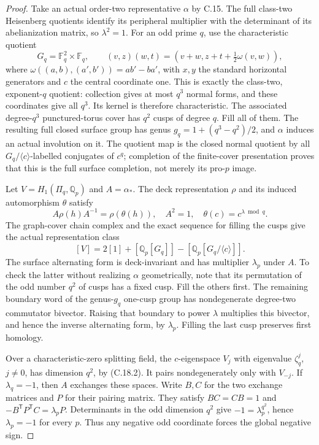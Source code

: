 \begin{proof}
Take an actual order-two representative $\alpha$ by C.15.
The full class-two Heisenberg quotients identify its
peripheral multiplier with the determinant of its
abelianization matrix, so $\lambda^2=1$.
For an odd prime $q$, use the characteristic quotient
\[
 G_q=\mathbb F_q^2\times\mathbb F_q,\qquad
 (v,z)(w,t)=(v+w,z+t+\tfrac12\omega(v,w)),
\]
where $\omega((a,b),(a',b'))=ab'-ba'$, with $x,y$
the standard horizontal generators and $c$ the central
coordinate one.  This is exactly the class-two,
exponent-$q$ quotient: collection gives at most $q^3$
normal forms, and these coordinates give all $q^3$.
Its kernel is therefore characteristic.
The associated degree-$q^3$ punctured-torus cover has
$q^2$ cusps of degree $q$.  Fill all of them.  The
resulting full closed surface group has genus
$g_q=1+(q^3-q^2)/2$, and $\alpha$ induces an actual
involution on it.  The quotient map is the closed
normal quotient by all $G_q/\langle c\rangle$-labelled
conjugates of $c^q$; completion of the finite-cover
presentation proves that this is the full surface
completion, not merely its pro-$p$ image.

Let $V=H_1(\Pi_q,\mathbb Q_p)$ and $A=\alpha_*$.  The
deck representation $\rho$ and its induced automorphism
$\theta$ satisfy
\[
 A\rho(h)A^{-1}=\rho(\theta(h)),\quad
 A^2=1,\quad\theta(c)=c^{\lambda\bmod q}.
                                                               \tag{C.18.1}
\]
The graph-cover chain complex and the exact sequence for
filling the cusps give the actual representation class
\[
 [V]=2[1]+[\mathbb Q_p[G_q]]
                 -[\mathbb Q_p[G_q/\langle c\rangle]].
                                                               \tag{C.18.2}
\]
The surface alternating form is deck-invariant and has
multiplier $\lambda_p$ under $A$.  To check the latter
without realizing $\alpha$ geometrically, note that its
permutation of the odd number $q^2$ of cusps has a fixed
cusp.  Fill the others first.  The remaining boundary
word of the genus-$g_q$ one-cusp group has nondegenerate
degree-two commutator bivector.  Raising that boundary
to power $\lambda$ multiplies this bivector, and hence
the inverse alternating form, by $\lambda_p$.
Filling the last cusp preserves first homology.

Over a characteristic-zero splitting field, the
$c$-eigenspace $V_j$ with eigenvalue $\zeta_q^j$,
$j\ne0$, has dimension $q^2$, by (C.18.2).  It pairs
nondegenerately only with $V_{-j}$.  If $\lambda_q=-1$,
then $A$ exchanges these spaces.  Write $B,C$ for the
two exchange matrices and $P$ for their pairing matrix.
They satisfy $BC=CB=1$ and
$-B^{\mathsf T}P^{\mathsf T}C=\lambda_pP$.
Determinants in the odd dimension $q^2$ give
$-1=\lambda_p^{q^2}$, hence $\lambda_p=-1$ for every
$p$.  Thus any negative odd coordinate forces the
global negative sign.


\end{proof}
